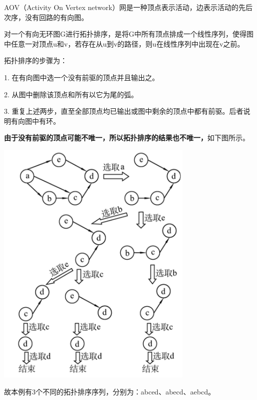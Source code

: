 {AOV（Activity On Vertex
network）网{是一种顶点表示活动，边表示活动的先后次序，没有回路的有向图。}}

{对一个有向无环图G进行拓扑排序，是将G中所有顶点排成一个线性序列，使得图中任意一对顶点u和v，若存在从u到v的路径，则u在线性序列中出现在v之前。}

{拓扑排序的步骤为：}

{1. 在有向图中选一个没有前驱的顶点并且输出之。}

{2. 从图中删除该顶点和所有以它为尾的弧。}

{3.
重复上述两步，直至全部顶点均已输出或图中剩余的顶点中都有前驱。后者说明有向图中有环。}

{{\textbf{由于没有前驱的顶点可能不唯一，所以拓扑排序的结果也不唯一，}}如下图所示。}

{\includegraphics[width=3.70833in,height=4.72917in]{png-jpeg-pics/1BE46EE02D14AF09C8488846718668CB.png}\\
\hspace*{0.333em}}

{故本例有3个不同的拓扑排序序列，分别为：abced、abecd、aebcd。}
